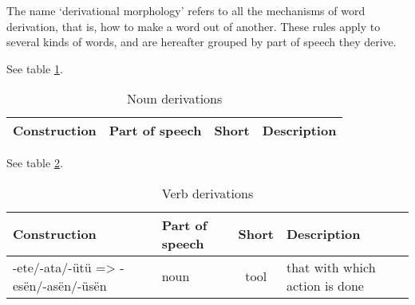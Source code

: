The name ‘derivational morphology’ refers to all the mechanisms of word derivation, that is, how to
make a word out of another. These rules apply to several kinds of words, and are hereafter grouped
by part of speech they derive.

See table \ref{tab:noun-derivations}.

\begin{table}[h]
\begin{center}
\begin{tabular}{|l|l|c|l|}\hline

\textbf{Construction} & \textbf{Part of speech} & \textbf{Short} & \textbf{Description} \\\hline

\end{tabular}
\end{center}
\caption{Noun derivations}
\label{tab:noun-derivations}
\end{table}

See table \ref{tab:verb-derivations}.

\begin{table}[h]
\begin{center}
\begin{tabular}{|l|l|c|l|}\hline

\textbf{Construction} & \textbf{Part of speech} & \textbf{Short} & \textbf{Description} \\\hline

-ete/-ata/-ütü => -esën/-asën/-üsën & noun & tool & that with which action is done \\\hline

\end{tabular}
\end{center}
\caption{Verb derivations}
\label{tab:verb-derivations}
\end{table}


